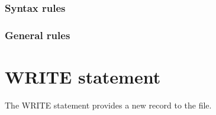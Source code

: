 \begin{syntax}
  \begin{0-1}
  \end{0-1}
    \identifier
\end{syntax}

\begin{syntax}
\end{syntax}

\subsubsection{Syntax rules}

\subsubsection{General rules}

\section{WRITE statement}

The WRITE statement provides a new record to the file.

